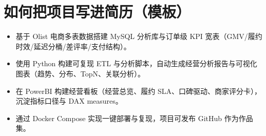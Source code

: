\documentclass[UTF8,11pt]{ctexart}
\begin{document}
\section{如何把项目写进简历（模板）}
\begin{itemize}
  \item 基于 Olist 电商多表数据搭建 MySQL 分析库与订单级 KPI 宽表（GMV/履约时效/延迟分桶/差评率/支付结构）。
  \item 使用 Python 构建可复现 ETL 与分析脚本，自动生成经营分析报告与可视化图表（趋势、分布、TopN、关联分析）。
  \item 在 PowerBI 构建经营看板（经营总览、履约 SLA、口碑驱动、商家评分卡），沉淀指标口径与 DAX measures。
  \item 通过 Docker Compose 实现一键部署与复现，项目可发布 GitHub 作为作品集。
\end{itemize}
\end{document}
